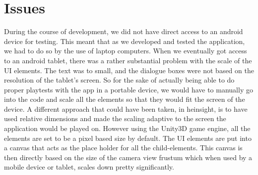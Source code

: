 \section{Issues}
During the course of development, we did not have direct access to an android device for testing. This meant that as we developed and tested the application, we had to do so by the use of laptop computers. When we eventually got access to an android tablet, there was a rather substantial problem with the scale of the UI elements. The text was to small, and the dialogue boxes were not based on the resolution of the tablet's screen. So for the sake of actually being able to do proper playtests with the app in a portable device, we would have to manually go into the code and scale all the elements so that they would fit the screen of the device. A different approach that could have been taken, in heinsight, is to have used relative dimensions and made the scaling adaptive to the screen the application would be played on. However using the Unity3D game engine, all the elements are set to be a pixel based size by default. The UI elements are put into a canvas that acts as the place holder for all the child-elements. This canvas is then directly based on the size of the camera view frustum which when used by a mobile device or tablet, scales down pretty significantly. 





